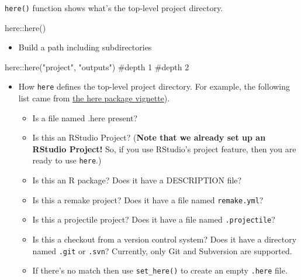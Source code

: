 \documentclass[
  letterpaper,
  DIV=11,
  numbers=noendperiod]{scrreprt}
\newenvironment{Shaded}{\begin{snugshade}}{\end{snugshade}}
\newcommand{\CommentTok}[1]{\textcolor[rgb]{0.37,0.37,0.37}{#1}}
\newcommand{\FunctionTok}[1]{\textcolor[rgb]{0.28,0.35,0.67}{#1}}
\newcommand{\NormalTok}[1]{\textcolor[rgb]{0.00,0.23,0.31}{#1}}
\newcommand{\SpecialCharTok}[1]{\textcolor[rgb]{0.37,0.37,0.37}{#1}}
\newcommand{\StringTok}[1]{\textcolor[rgb]{0.13,0.47,0.30}{#1}}
\providecommand{\tightlist}{%
  \setlength{\itemsep}{0pt}\setlength{\parskip}{0pt}}\usepackage{longtable,booktabs,array}
\begin{document}
\texttt{here()} function shows what's the top-level project directory.

\begin{Shaded}
\begin{Highlighting}[]
\NormalTok{here}\SpecialCharTok{::}\FunctionTok{here}\NormalTok{()}
\end{Highlighting}
\end{Shaded}

\begin{itemize}
\tightlist
\item
  Build a path including subdirectories
\end{itemize}

\begin{Shaded}
\begin{Highlighting}[]
\NormalTok{here}\SpecialCharTok{::}\FunctionTok{here}\NormalTok{(}\StringTok{"project"}\NormalTok{, }\StringTok{"outputs"}\NormalTok{)}
           \CommentTok{\#depth 1   \#depth 2}
\end{Highlighting}
\end{Shaded}

\begin{itemize}
\item
  How \texttt{here} defines the top-level project directory. For
  example, the following list came from
  \href{https://GitHub.com/jennybc/here_here}{the here package
  vignette}).

  \begin{itemize}
  \item
    Is a file named .here present?
  \item
    Is this an RStudio Project? (\textbf{Note that we already set up an
    RStudio Project!} So, if you use RStudio's project feature, then you
    are ready to use \texttt{here}.)
  \item
    Is this an R package? Does it have a DESCRIPTION file?
  \item
    Is this a remake project? Does it have a file named
    \texttt{remake.yml}?
  \item
    Is this a projectile project? Does it have a file named
    \texttt{.projectile}?
  \item
    Is this a checkout from a version control system? Does it have a
    directory named \texttt{.git} or \texttt{.svn}? Currently, only Git
    and Subversion are supported.
  \item
    If there's no match then use \texttt{set\_here()} to create an empty
    \texttt{.here} file.
  \end{itemize}
\end{itemize}
\end{document}
